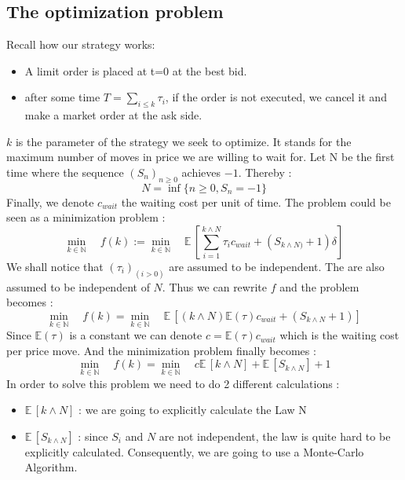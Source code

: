 \documentclass{article}
\newcommand{\Min}[2]{ {#1} \wedge {#2} }
\begin{document}
\subsection{The optimization problem}
Recall how our strategy works:
\begin{itemize}
	\item A limit order is placed at t=0 at the best bid.
	\item after some time $T = \sum_{i \leq k} \tau_i$, if the order is not executed, we cancel it and make a market order at the ask side.
\end{itemize}
$k$ is the parameter of the strategy we seek to optimize. It stands for the maximum number of moves in price we are willing to wait for. 
Let N be the first time where the sequence $(S_{n})_{n\geq0}$  achieves $-1$. Thereby :
$$ N= \inf \{ n\geq0 , S_{n}=-1   \} $$
Finally, we denote $c_{wait}$ the waiting cost per unit of time.
The problem could be seen as a minimization problem  :
\begin{equation}
 \min\limits_{k \in \mathbb{N}} \quad f(k) := \min\limits_{k \in \mathbb{N}} \quad \mathbb{E}\,\left[ \sum_{i=1}^{\Min k N}\tau_i c_{wait} + (S_{\Min k N)}+1)\delta\right]
\end{equation}
We shall notice that $(\tau_i)_{(i>0)}$ are assumed to be independent. The are also assumed to be independent of $N$.
Thus we can rewrite $f$ and the problem becomes : 
\begin{equation}
 \min\limits_{k \in \mathbb{N}} \quad f(k)= \min\limits_{k \in \mathbb{N}} \quad \mathbb{E}\,\left[ ({\Min k N})  \mathbb{E}(\tau) c_{wait} + (S_{\Min k N}+1) \right]
\end{equation}
Since $\mathbb{E}(\tau)$ is a constant we can denote
$c = \mathbb{E}(\tau) c_{wait}$ which is the waiting cost per price move. And the minimization problem finally becomes :
\begin{equation}
 \min\limits_{k \in \mathbb{N}} \quad f(k)= \min\limits_{k \in \mathbb{N}} \quad c \mathbb{E}\,\left[ {\Min k N}\right]   +  \mathbb{E}\,\left[S_{\Min k N}\right] +1
\end{equation}
In order to solve this problem we need to do 2 different calculations :
\begin{itemize}
\item $\mathbb{E}\,\left[ {\Min k N}\right]$ : we are going to explicitly calculate the Law N
\item $\mathbb{E}\,\left[S_{\Min k N}\right]$ : since $S_i$ and $N$ are not independent, the law is quite hard to be explicitly calculated. Consequently, we are going to use a Monte-Carlo Algorithm.
\end{itemize}
\end{document}
